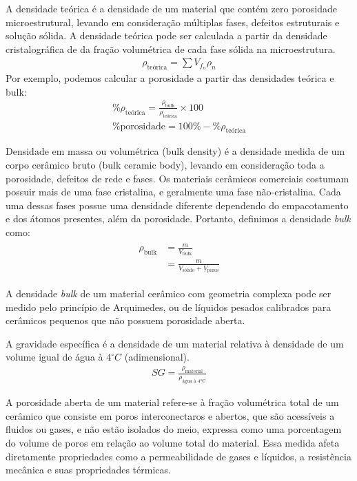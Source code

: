 \begin{definition}
  A densidade teórica é a densidade de um material que contém zero porosidade microestrutural, levando em consideração múltiplas fases, defeitos estruturais e solução sólida. A densidade teórica pode ser calculada a partir da densidade cristalográfica de da fração volumétrica de cada fase sólida na microestrutura.
  \begin{gather}
    \rho_{\text{teórica}} = \sum V_{f_n} \rho_n
  \end{gather}
  Por exemplo, podemos calcular a porosidade a partir das densidades teórica e bulk:
  \begin{gather}
    \% \rho_{\text{teórica}} = \frac{\rho_{\text{bulk}}}{\rho_{\text{teórica}}} \times 100 \\
    \% \text{porosidade} = 100\% - \% \rho_{\text{teórica}}
  \end{gather}
\end{definition}

\begin{definition}
  Densidade em massa ou volumétrica (bulk density) é a densidade medida de um corpo cerâmico bruto (bulk ceramic body), levando em consideração toda a porosidade, defeitos de rede e fases. Os materiais cerâmicos comerciais costumam possuir mais de uma fase cristalina, e geralmente uma fase não-cristalina. Cada uma dessas fases possue uma densidade diferente dependendo do empacotamento e dos átomos presentes, além da porosidade. Portanto, definimos a densidade \textit{bulk} como:
  \begin{gather}
    \begin{align}
      \rho_{\text{bulk}} &= \frac{m}{V_{\text{bulk}}} \\
              &= \frac{m}{V_{\text{sólido}} + V_{\text{poros}}} 
    \end{align}
  \end{gather}
\end{definition}

A densidade \textit{bulk} de um material cerâmico com geometria complexa pode ser medido pelo princípio de Arquimedes, ou de líquidos pesados calibrados para cerâmicos pequenos que não possuem porosidade aberta.

\begin{definition}
  A gravidade específica é a densidade de um material relativa à densidade de um volume igual de água à $4^\circ C$ (adimensional).
  \begin{gather}
    SG = \frac{\rho_{\text{material}}}{\rho_{\text{água à 4ºC}}}
  \end{gather}
\end{definition}

A porosidade aberta de um material refere-se à fração volumétrica total de um cerâmico que consiste em poros interconectaros e abertos, que são acessíveis a fluidos ou gases, e não estão isolados do meio, expressa como uma porcentagem do volume de poros em relação ao volume total do material. Essa medida afeta diretamente propriedades como a permeabilidade de gases e líquidos, a resistência mecânica e suas propriedades térmicas.

